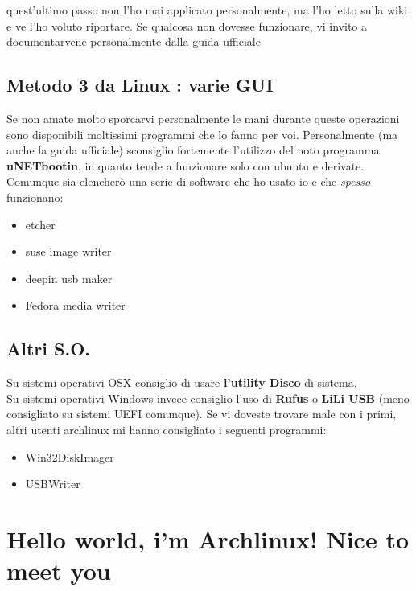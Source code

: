 \documentclass[twoside,italian]{book}
\begin{document}
			\begin{tcolorbox}[floatplacement=b,width=\textwidth,colback={white},title={ATTENZIONE:},colbacktitle=red,coltitle=white,colupper=red]

				quest'ultimo passo non l'ho mai applicato personalmente, ma l'ho letto sulla wiki e ve l'ho voluto riportare. Se qualcosa non dovesse funzionare, vi invito  a documentarvene personalmente dalla guida ufficiale

			\end{tcolorbox}


		\section{Metodo 3 da Linux : varie GUI}
			Se non amate molto sporcarvi personalmente le mani durante queste operazioni sono disponibili moltissimi programmi che lo fanno per voi. Personalmente (ma anche la guida ufficiale) sconsiglio fortemente l'utilizzo del noto programma \textbf{uNETbootin}, in quanto tende a funzionare solo con ubuntu e derivate. Comunque sia elencherò una serie di software che ho usato io e che \textit{spesso} funzionano:

			\begin{itemize}
				\item etcher
				\item suse image writer
				\item deepin usb maker
				\item Fedora media writer
			\end{itemize}


		\section{Altri S.O.}

			Su sistemi operativi OSX consiglio di usare \textbf{l'utility Disco} di sistema.
			\\
			Su sistemi operativi Windows invece consiglio l'uso di \textbf{Rufus} o \textbf{LiLi USB} (meno consigliato su sistemi UEFI comunque).
			Se vi doveste trovare male con i primi, altri utenti archlinux mi hanno consigliato i seguenti programmi:
			\begin{itemize}
				\item Win32DiskImager
				\item USBWriter
			\end{itemize}


	\chapter{Hello world, i'm Archlinux! Nice to meet you}
\end{document}
